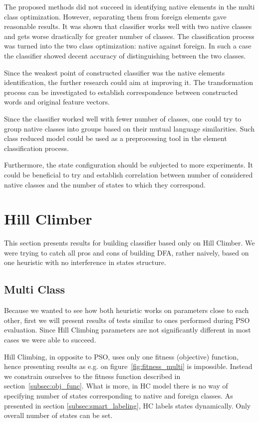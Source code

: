 \documentclass{mini}
\begin{document}
The proposed methods did not succeed in identifying native elements in the multi class optimization. However, separating them from foreign elements gave reasonable results. It was shown that classifier works well with two native classes and gets worse drastically for greater number of classes. The classification process was turned into the two class optimization: native against foreign. In such a case the classifier showed decent accuracy of distinguishing between the two classes.

Since the weakest point of constructed classifier was the native elements identification, the further research could aim at improving it. The transformation process can be investigated to establish correspondence between constructed words and original feature vectors.

Since the classifier worked well with fewer number of classes, one could try to group native classes into groups based on their mutual language similarities. Such class reduced model could be used as a preprocessing tool in the element classification process. 

Furthermore, the state configuration should be subjected to more experiments.
It could be beneficial to try and establish correlation between number of considered native classes and the number of states to which they correspond.


\pagebreak
%
%
\section{Hill Climber}
This section presents results for building classifier based only on Hill Climber. We were trying to catch all pros and cons of building DFA, rather naively, based on one heuristic with no interference in states structure. 

\subsection{Multi Class} \label{subsec:multi_class_hc}
Because we wanted to see how both heuristic works on parameters close to each other, first we will present results of tests similar to ones performed during PSO evaluation. Since Hill Climbing parameters are not significantly different in most cases we were able to succeed.

Hill Climbing, in opposite to PSO,  uses only one fitness (objective) function, hence presenting results as e.g. on figure~\ref{fig:fitness_multi} is impossible. Instead we constrain ourselves to the fitness function described in section~\ref{subsec:obj_func}. What is more, in HC model there is no way of specifying number of states corresponding to native and foreign classes. As presented in section \ref{subsec:smart_labeling}, HC labels states dynamically. Only overall number of states can be set.  
\end{document}

